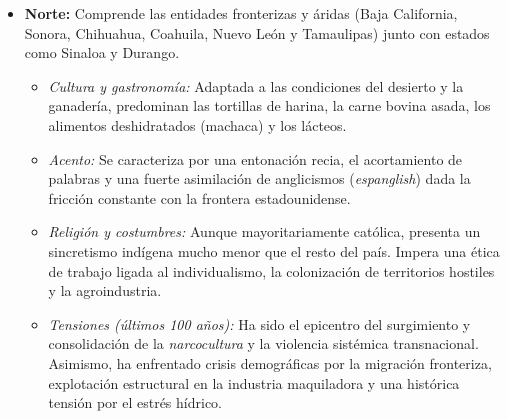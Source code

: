 \begin{itemize}
    \item \textbf{Norte:} Comprende las entidades fronterizas y áridas
    (Baja California, Sonora, Chihuahua, Coahuila, Nuevo León y Tamaulipas) junto con
    estados como Sinaloa y Durango.
    \begin{itemize}
        \item \textit{Cultura y gastronomía:} Adaptada a las condiciones del desierto y la ganadería,
                predominan las tortillas de harina, la carne bovina asada, los alimentos
                deshidratados (machaca) y los lácteos.
        \item \textit{Acento:} Se caracteriza por una entonación recia, el acortamiento de
                palabras y una fuerte asimilación de anglicismos (\textit{espanglish}) dada la
                fricción constante con la frontera estadounidense.
        \item \textit{Religión y costumbres:} Aunque mayoritariamente católica, presenta un sincretismo
                indígena mucho menor que el resto del país. Impera una ética de trabajo ligada al
                individualismo, la colonización de territorios hostiles y la agroindustria.
        \item \textit{Tensiones (últimos 100 años):} Ha sido el epicentro del surgimiento y
                consolidación de la \textit{narcocultura} y la violencia sistémica transnacional.
                Asimismo, ha enfrentado crisis demográficas por la migración fronteriza,
                explotación estructural en la industria maquiladora y una histórica tensión
                por el estrés hídrico.
    \end{itemize}


\end{itemize}
